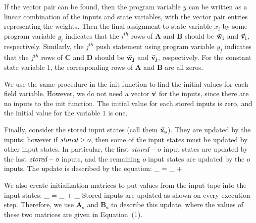 If the vector pair can be found, then the program variable $y$ can be
written as a linear combination of the inputs and state variables,
with the vector pair entries representing the weights.  Then the final
assignment to state variable $x_i$ by some program variable $y_i$
indicates that the $i^{th}$ rows of $\mathbf{A}$ and $\mathbf{B}$
should be ${\vec{\mathbf{w}}}_{\mathbf{i}}$ and ${\vec{\mathbf{v}}}_{\mathbf{i}}$,
respectively. Similarly, the $j^{th}$ push statement using program
variable $y_j$ indicates that the $j^{th}$ rows of $\mathbf{C}$ and
$\mathbf{D}$ should be ${\vec{\mathbf{w}}}_{\mathbf{j}}$ and ${\vec{\mathbf{v}}}_{\mathbf{j}}$,
respectively. For the constant state variable $1$, the corresponding
rows of $\mathbf{A}$ and $\mathbf{B}$ are all zeros.

We use the same procedure in the init function to find the initial
values for each field variable. However, we do not need a vector
$\vec{\mathbf{v}}$ for the inputs, since there are no inputs to
the init function. The initial value for each stored inputs is
zero, and the initial value for the variable $1$ is one.

Finally, consider the stored input states (call them
${\vec{\mathbf{x}}}_{\mathbf{s}}$). They are updated by the inputs; however if
$\mbox{\it stored} > o$, then some of the input states must be updated by other
input states. In particular, the first $\mbox{\it stored}-o$ input states are
updated by the last $\mbox{\it stored}-o$ inputs, and the remaining $o$ input
states are updated by the $o$ inputs. The update is described by the
equation:
\vspace{-26pt}
\starteqn
{}_{} = _{} + 
\doneeqn

We also create initialization matrices to put values from the input
tape into the input states:
\starteqnstar
{}_{} =  {}_{} +
 {}_{}
\doneeqnstar
Stored inputs are updated as shown on every execution step.
Therefore, we use $\mathbf{A_s}$ and $\mathbf{B_s}$ to describe
this update, where the values of these two matrices are given in
Equation~(1).


